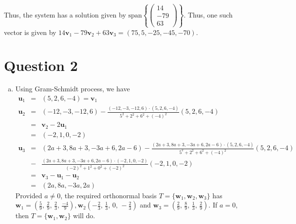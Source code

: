 \documentclass{article}
\newcommand{\matr}[1]{\mathbf{#1}}
\newcommand{\spn}{\text{span}}
\begin{document}
\begin{enumerate}[(a)]
Thus, the system has a solution given by $\spn\left\{\begin{pmatrix}14\\-79\\63\end{pmatrix}\right\}.$ Thus, one such vector is given by $14\matr{v}_1-79\matr{v}_2+63\matr{v}_3=(75, 5, -25, -45, -70)$.
\end{enumerate}
\section*{Question 2}
\begin{enumerate}[(a)]
    \item Using Gram-Schmidt process, we have
    \begin{eqnarray*}
    \matr{u}_1&=&(5,2,6,-4)=\matr v_1\\
    \matr{u}_2&=&(-12,-3,-12,6)-\frac{(-12,-3,-12,6)\cdot(5,2,6,-4)}{5^2+2^2+6^2+(-4)^2}(5,2,6,-4)\\
    &=& \matr v_2 - 2\matr u_1 \\
    &=&(-2,1,0,-2)\\
    \matr{u}_3&=&(2a+3,8a+3,-3a+6,2a-6)-\frac{(2a+3,8a+3,-3a+6,2a-6)\cdot(5,2,6,-4)}{5^2+2^2+6^2+(-4)^2}(5,2,6,-4)\\
    &-&\frac{(2a+3,8a+3,-3a+6,2a-6)\cdot(-2,1,0,-2)}{(-2)^2+1^2+0^2+(-2)^2}(-2,1,0,-2)\\
    &=& \matr v_3 - \matr u_1 - \matr u_2 \\
    &=&(2a,8a,-3a,2a)
    \end{eqnarray*}
    Provided $a \neq 0$, the required orthonormal basis $T =\{\matr w_1, \matr w_2, \matr w_3\}$ has $\matr w_1 = \left(\frac{5}{9},\,\frac{2}{9},\,\frac{2}{3},\,\frac{-4}{9}\right), \matr w_2 \left(-\frac{2}{3},\,\frac{1}{3},\,0,\,-\frac{2}{3}\right)$ and $\matr w_3 = \left(\frac{2}{9},\,\frac{8}{9},\,\frac{1}{3},\,\frac{2}{9}\right)$. If $a=0$, then $T =\{\matr w_1, \matr w_2\}$ will do.
    

\end{enumerate}
\end{document}
